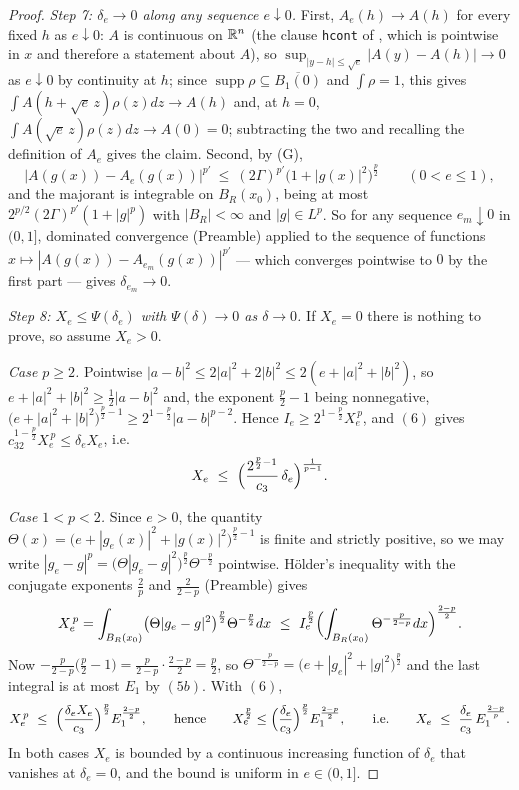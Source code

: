 \begin{proof}
\emph{Step 7: $\delta_e\to0$ along any sequence $e\downarrow0$.}  First,
$A_e(h)\to A(h)$ for every fixed $h$ as $e\downarrow0$: $A$ is continuous on
$\mathbb{R}^n$ (the clause \texttt{hcont} of , which is
pointwise in $x$ and therefore a statement about $A$), so
$\sup_{|y-h|\le\sqrt e}|A(y)-A(h)|\to0$ as $e\downarrow0$ by continuity at $h$;
since $\operatorname{supp}\rho\subseteq\overline{B_1(0)}$ and $\int\rho=1$, this
gives $\int A(h+\sqrt e\,z)\rho(z)dz\to A(h)$ and, at $h=0$,
$\int A(\sqrt e\,z)\rho(z)dz\to A(0)=0$; subtracting the two and recalling the
definition of $A_e$ gives the claim.  Second, by (G),
\[
\bigl|A(g(x))-A_e(g(x))\bigr|^{p'}\ \le\ (2\Gamma)^{p'}\bigl(1+|g(x)|^2\bigr)^{\frac p2}
\qquad(0<e\le1),
\]
and the majorant is integrable on $B_R(x_0)$, being at most
$2^{p/2}(2\Gamma)^{p'}(1+|g|^p)$ with $|B_R|<\infty$ and $|g|\in L^p$.  So for
any sequence $e_m\downarrow0$ in $(0,1]$, dominated convergence (Preamble)
applied to the sequence of functions $x\mapsto|A(g(x))-A_{e_m}(g(x))|^{p'}$ ---
which converges pointwise to $0$ by the first part --- gives
$\delta_{e_m}\to0$.

\emph{Step 8: $X_e\le\Psi(\delta_e)$ with $\Psi(\delta)\to0$ as $\delta\to0$.}
If $X_e=0$ there is nothing to prove, so assume $X_e>0$.

\emph{Case $p\ge2$.}  Pointwise $|a-b|^2\le2|a|^2+2|b|^2\le2(e+|a|^2+|b|^2)$,
so $e+|a|^2+|b|^2\ge\frac12|a-b|^2$ and, the exponent $\frac p2-1$ being
nonnegative,
$\bigl(e+|a|^2+|b|^2\bigr)^{\frac p2-1}\ge2^{1-\frac p2}|a-b|^{p-2}$.  Hence
$I_e\ge2^{1-\frac p2}X_e^{\,p}$, and $(6)$ gives
$c_32^{1-\frac p2}X_e^{\,p}\le\delta_eX_e$, i.e.
\[
X_e\ \le\ \Bigl(\frac{2^{\frac p2-1}}{c_3}\,\delta_e\Bigr)^{\frac1{p-1}} .
\]

\emph{Case $1<p<2$.}  Since $e>0$, the quantity
$\Theta(x)=\bigl(e+|g_e(x)|^2+|g(x)|^2\bigr)^{\frac p2-1}$ is finite and
strictly positive, so we may write
$|g_e-g|^p=\bigl(\Theta|g_e-g|^2\bigr)^{\frac p2}\Theta^{-\frac p2}$ pointwise.
Hölder's inequality with the conjugate exponents $\frac2p$ and $\frac2{2-p}$
(Preamble) gives
\[
X_e^{\,p}=\int_{B_R(x_0)}\bigl(\Theta|g_e-g|^2\bigr)^{\frac p2}\Theta^{-\frac p2}dx
\ \le\ I_e^{\frac p2}
\Bigl(\int_{B_R(x_0)}\Theta^{-\frac p{2-p}}dx\Bigr)^{\frac{2-p}2} .
\]
Now $-\frac p{2-p}\bigl(\frac p2-1\bigr)=\frac p{2-p}\cdot\frac{2-p}2=\frac p2$,
so $\Theta^{-\frac p{2-p}}=\bigl(e+|g_e|^2+|g|^2\bigr)^{\frac p2}$ and the last
integral is at most $E_1$ by $(5b)$.  With $(6)$,
\[
X_e^{\,p}\ \le\ \Bigl(\frac{\delta_eX_e}{c_3}\Bigr)^{\frac p2}E_1^{\frac{2-p}2},
\qquad\text{hence}\qquad
X_e^{\frac p2}\le\Bigl(\frac{\delta_e}{c_3}\Bigr)^{\frac p2}E_1^{\frac{2-p}2},
\qquad\text{i.e.}\qquad
X_e\ \le\ \frac{\delta_e}{c_3}\,E_1^{\frac{2-p}p} .
\]
In both cases $X_e$ is bounded by a continuous increasing function of
$\delta_e$ that vanishes at $\delta_e=0$, and the bound is uniform in
$e\in(0,1]$.


\end{proof}
